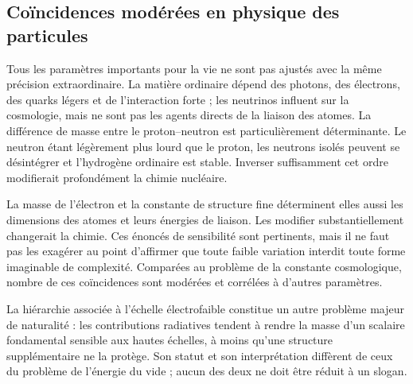 \subsection{Coïncidences modérées en physique des particules}

Tous les paramètres importants pour la vie ne sont pas ajustés avec la même précision extraordinaire. La matière ordinaire dépend des photons, des électrons, des quarks légers et de l’interaction forte ; les neutrinos influent sur la cosmologie, mais ne sont pas les agents directs de la liaison des atomes. La différence de masse entre le proton--neutron est particulièrement déterminante. Le neutron étant légèrement plus lourd que le proton, les neutrons isolés peuvent se désintégrer et l’hydrogène ordinaire est stable. Inverser suffisamment cet ordre modifierait profondément la chimie nucléaire.

La masse de l’électron et la constante de structure fine déterminent elles aussi les dimensions des atomes et leurs énergies de liaison. Les modifier substantiellement changerait la chimie. Ces énoncés de sensibilité sont pertinents, mais il ne faut pas les exagérer au point d’affirmer que toute faible variation interdit toute forme imaginable de complexité. Comparées au problème de la constante cosmologique, nombre de ces coïncidences sont modérées et corrélées à d’autres paramètres.

La hiérarchie associée à l’échelle électrofaible constitue un autre problème majeur de naturalité : les contributions radiatives tendent à rendre la masse d’un scalaire fondamental sensible aux hautes échelles, à moins qu’une structure supplémentaire ne la protège. Son statut et son interprétation diffèrent de ceux du problème de l’énergie du vide ; aucun des deux ne doit être réduit à un slogan.

\begin{classroomqa}
\end{classroomqa}

\begin{classroomqa}
\end{classroomqa}

